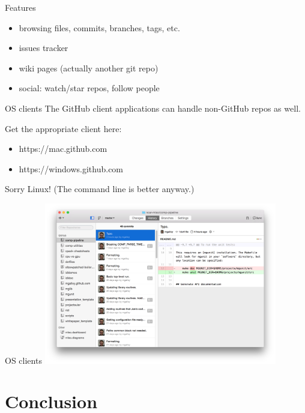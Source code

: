 \documentclass{beamer}
\begin{document}
\begin{frame}{Features}
  \begin{itemize}
    \item browsing files, commits, branches, tags, etc.
    \item issues tracker
    \item wiki pages (actually another git repo)
    \item social: watch/star repos, follow people
  \end{itemize}
\end{frame}

\begin{frame}{OS clients}
The GitHub client applications can handle non-GitHub repos as well.

\vspace{1em}

Get the appropriate client here:
  \begin{itemize}
    \item https://mac.github.com
    \item https://windows.github.com
  \end{itemize}
Sorry Linux! (The command line is better anyway.)
\end{frame}

\begin{frame}{OS clients}
  \includegraphics[width=4in]{mac-client.png}
\end{frame}


\section{Conclusion}
\subsection*{}
\end{document}
